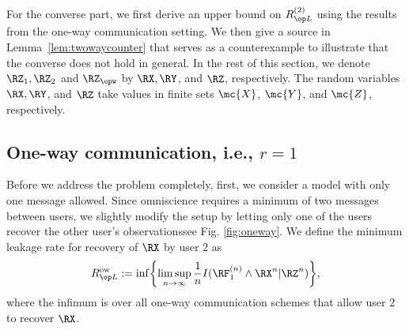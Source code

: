 

For the converse part, we first derive an upper bound on $\rl^{(2)}$ using the results from the one-way communication setting. We then give a source in Lemma~\ref{lem:twowaycounter} that serves as a counterexample to illustrate that the converse does not hold in general. In the rest of this section, we denote $\RZ_1,\RZ_2$ and $\RZ_{\opw}$ by $\RX, \RY$, and $\RZ$, respectively. The random variables $\RX, \RY$, and $\RZ$ take values in  finite sets $\mc{X}$, $\mc{Y}$, and $\mc{Z}$, respectively.

\subsection{One-way communication, i.e., $r=1$}
Before we address the problem completely, first, we consider a model with only one message allowed. Since omniscience requires a minimum of two messages between users, we slightly modify the setup by letting only one of the users recover the other user's observations\textemdash see Fig. \ref{fig:oneway}. We define the minimum leakage rate for recovery of $\RX$ by user $2$ as 
$$\rl^{\text{ow}}:= \inf  \biggl\lbrace \limsup_{n \to \infty} \frac{1}{n}I(\RF_1^{(n)} \wedge \RX^n|\RZ^n) \biggr\rbrace,$$ where the infimum is over all one-way communication schemes that allow user $2$ to recover $\RX$. 


